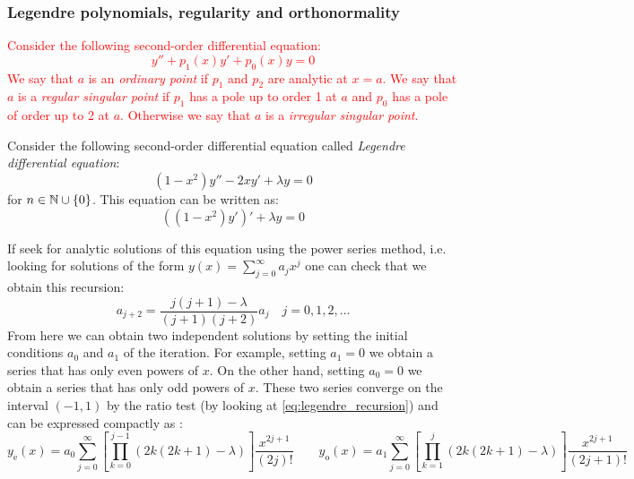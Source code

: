 \documentclass[../main.tex]{subfiles}
\begin{document}
\subsubsection{Legendre polynomials, regularity and orthonormality}
\begin{definition}
  \textcolor{red}{Consider the following second-order differential equation:
    \begin{equation}
      y''+p_1(x)y'+p_0(x)y=0
    \end{equation}
    We say that $a$ is an \emph{ordinary point} if $p_1$ and $p_2$ are analytic at $x=a$. We say that $a$ is a \emph{regular singular point} if $p_1$ has a pole up to order 1 at $a$ and $p_0$ has a pole of order up to 2 at $a$. Otherwise we say that $a$ is a \emph{irregular singular point}.}
\end{definition}
\begin{definition}
  Consider the following second-order differential equation called \emph{Legendre differential equation}:
  \begin{equation}
    (1-x^2)y''-2xy'+\lambda y=0
  \end{equation}
  for $n\in\mathbb{N}\cup\{0\}$. This equation can be written as:
  \begin{equation}\label{eq:legendre_diff_eq}
    {((1-x^2)y')}'+\lambda  y=0
  \end{equation}
\end{definition}
If seek for analytic solutions of this equation using the power series method, i.e. looking for solutions of the form $y(x)=\sum_{j=0}^{\infty}a_jx^j$ one can check that we obtain this recursion:
\begin{equation}\label{eq:legendre_recursion}
  a_{j+2}=\frac{j(j+1)-\lambda}{(j+1)(j+2)}a_j\quad j=0,1,2,\ldots
\end{equation}
From here we can obtain two independent solutions by setting the initial conditions $a_0$ and $a_1$ of the iteration. For example, setting $a_1=0$ we obtain a series that has only even powers of $x$. On the other hand, setting $a_0=0$ we obtain a series that has only odd powers of $x$. These two series converge on the interval $(-1,1)$ by the ratio test (by looking at \cref{eq:legendre_recursion}) and can be expressed compactly as \cite{florida:legendre}:
\begin{equation}\label{eq:legendre_series}
  y_\mathrm{e}(x)=a_0\sum_{j=0}^{\infty}\left[\prod_{k=0}^{j-1}(2k(2k+1)-\lambda)\right]\frac{x^{2j+1}}{(2j)!}\qquad y_\mathrm{o}(x)=a_1\sum_{j=0}^{\infty}\left[\prod_{k=1}^j(2k(2k+1)-\lambda)\right]\frac{x^{2j+1}}{(2j+1)!}
\end{equation}
\end{document}
